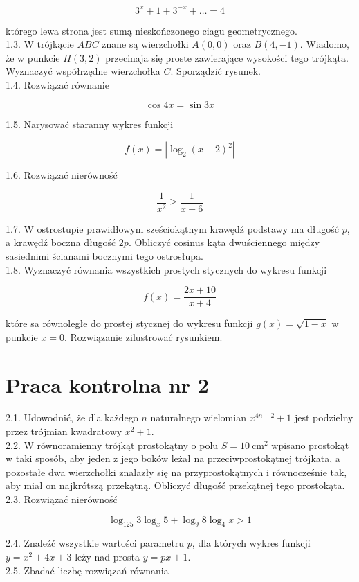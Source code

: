 \documentclass[10pt]{article}
\begin{document}
$$
3^{x}+1+3^{-x}+\ldots=4
$$

którego lewa strona jest sumą nieskończonego ciagu geometrycznego.\\
1.3. W trójkącie $A B C$ znane są wierzchołki $A(0,0)$ oraz $B(4,-1)$. Wiadomo, że w punkcie $H(3,2)$ przecinaja się proste zawierające wysokości tego trójkąta. Wyznaczyć współrzędne wierzchołka $C$. Sporządzić rysunek.\\
1.4. Rozwiązać równanie

$$
\cos 4 x=\sin 3 x
$$

1.5. Narysować staranny wykres funkcji

$$
f(x)=\left|\log _{2}(x-2)^{2}\right|
$$

1.6. Rozwiązać nierówność

$$
\frac{1}{x^{2}} \geq \frac{1}{x+6}
$$

1.7. W ostrostupie prawidłowym sześciokątnym krawędź podstawy ma długość $p$, a krawędź boczna długość $2 p$. Obliczyć cosinus kąta dwuściennego między sasiednimi ścianami bocznymi tego ostrosłupa.\\
1.8. Wyznaczyć równania wszystkich prostych stycznych do wykresu funkcji

$$
f(x)=\frac{2 x+10}{x+4}
$$

które sa równoległe do prostej stycznej do wykresu funkcji $g(x)=\sqrt{1-x}$ w punkcie $x=0$. Rozwiązanie zilustrować rysunkiem.

\section*{Praca kontrolna nr 2}
2.1. Udowodnić, że dla każdego $n$ naturalnego wielomian $x^{4 n-2}+1$ jest podzielny przez trójmian kwadratowy $x^{2}+1$.\\
2.2. W równoramienny trójkąt prostokątny o polu $S=10 \mathrm{~cm}^{2}$ wpisano prostokąt w taki sposób, aby jeden z jego boków leżał na przeciwprostokątnej trójkata, a pozostałe dwa wierzchołki znalazły się na przyprostokątnych i równocześnie tak, aby miał on najkrótszą przekątną. Obliczyć długość przekątnej tego prostokąta.\\
2.3. Rozwiązać nierówność

$$
\log _{125} 3 \log _{x} 5+\log _{9} 8 \log _{4} x>1
$$

2.4. Znaleźć wszystkie wartości parametru $p$, dla których wykres funkcji $y=x^{2}+4 x+3$ leży nad prosta $y=p x+1$.\\
2.5. Zbadać liczbę rozwiązań równania
\end{document}
